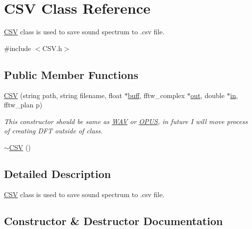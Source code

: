\hypertarget{class_c_s_v}{}\section{C\+SV Class Reference}
\label{class_c_s_v}


\hyperlink{class_c_s_v}{C\+SV} class is used to save sound spectrum to .csv file.  




{\ttfamily \#include $<$C\+S\+V.\+h$>$}

\subsection*{Public Member Functions}
\begin{DoxyCompactItemize}
\item 
\hyperlink{class_c_s_v_a7ba492a7aea573fdce5280c1b1f76d62}{C\+SV} (string path, string filename, float $\ast$\hyperlink{_get_mic_8cpp_aa621af3ba2234c04a5f309a94576b011}{buff}, fftw\+\_\+complex $\ast$\hyperlink{_get_mic_8cpp_a0ff8e98f72df2389143723d3b8e88ce2}{out}, double $\ast$\hyperlink{_get_mic_8cpp_a5e0f598fffa03bb7026d3a2a168810db}{in}, fftw\+\_\+plan p)
\begin{DoxyCompactList}\small\item\em This constructor should be same as \hyperlink{class_w_a_v}{W\+AV} or \hyperlink{class_o_p_u_s}{O\+P\+US}, in future I will move process of creating D\+FT outside of class. \end{DoxyCompactList}\item 
\hyperlink{class_c_s_v_ae1b0cfd98d62cf81004462320848c665}{$\sim$\+C\+SV} ()
\end{DoxyCompactItemize}


\subsection{Detailed Description}
\hyperlink{class_c_s_v}{C\+SV} class is used to save sound spectrum to .csv file. 

\subsection{Constructor \& Destructor Documentation}
\mbox{\label{class_c_s_v_a7ba492a7aea573fdce5280c1b1f76d62}} 
